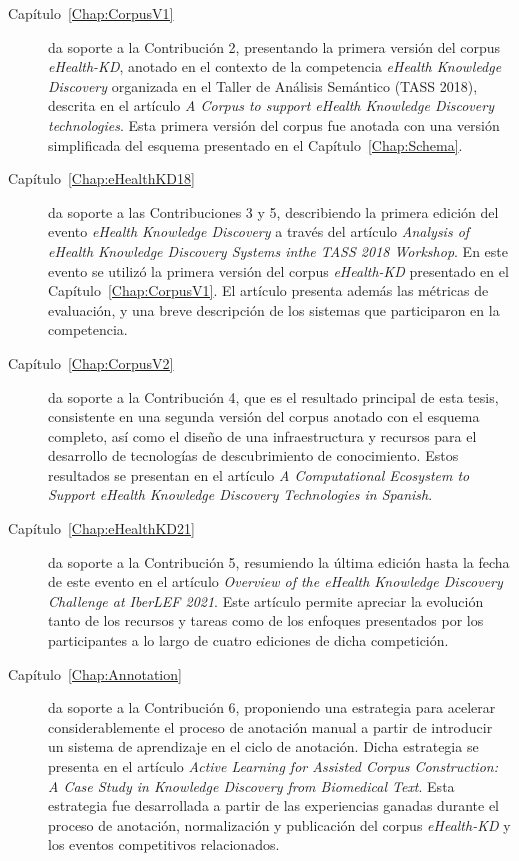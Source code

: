 \begin{description}
\item [Capítulo~\ref{Chap:CorpusV1}] da soporte a la Contribución 2, presentando la primera versión del corpus \textit{eHealth-KD}, anotado en el contexto de la competencia \textit{eHealth Knowledge Discovery} organizada en el Taller de Análisis Semántico (TASS 2018), descrita en el artículo \textit{A Corpus to support eHealth Knowledge Discovery technologies}. Esta primera versión del corpus fue anotada con una versión simplificada del esquema presentado en el Capítulo~\ref{Chap:Schema}.

\item [Capítulo~\ref{Chap:eHealthKD18}] da soporte a las Contribuciones 3 y 5, describiendo la primera edición del evento \textit{eHealth Knowledge Discovery} a través del artículo \textit{Analysis of eHealth Knowledge Discovery Systems inthe TASS 2018 Workshop}. En este evento se utilizó la primera versión del corpus \textit{eHealth-KD} presentado en el Capítulo~\ref{Chap:CorpusV1}. El artículo presenta además las métricas de evaluación, y una breve descripción de los sistemas que participaron en la competencia.

\item [Capítulo~\ref{Chap:CorpusV2}] da soporte a la Contribución 4, que es el resultado principal de esta tesis, consistente en una segunda versión del corpus  anotado con el esquema completo, así como el diseño de una infraestructura y recursos para el desarrollo de tecnologías de descubrimiento de conocimiento.
Estos resultados se presentan en el artículo \textit{A Computational Ecosystem to Support eHealth Knowledge Discovery Technologies in Spanish}.

\item [Capítulo~\ref{Chap:eHealthKD21}] da soporte a la Contribución 5, resumiendo la última edición hasta la fecha de este evento en el artículo \textit{Overview of the eHealth Knowledge Discovery Challenge at IberLEF 2021}. Este artículo permite apreciar la evolución tanto de los recursos y tareas como de los enfoques presentados por los participantes a lo largo de cuatro ediciones de dicha competición.

\item [Capítulo~\ref{Chap:Annotation}] da soporte a la Contribución 6, proponiendo una estrategia para acelerar considerablemente el proceso de anotación manual a partir de introducir un sistema de aprendizaje en el ciclo de anotación. Dicha estrategia se presenta en el artículo \textit{Active Learning for Assisted Corpus Construction: A Case Study in Knowledge Discovery from Biomedical Text}. Esta estrategia fue desarrollada a partir de las experiencias ganadas durante el proceso de anotación, normalización y publicación del corpus \textit{eHealth-KD} y los eventos competitivos relacionados.


\end{description}
